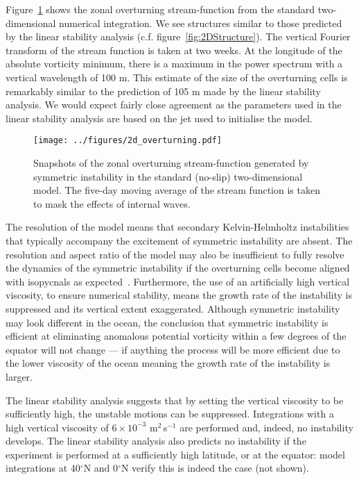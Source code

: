 Figure~\ref{fig:2DStandardOverturningStreamfunction} shows the zonal overturning stream-function from the standard two-dimensional numerical integration. We see structures similar to those predicted by the linear stability analysis (c.f. figure~\ref{fig:2DStructure}). The vertical Fourier transform of the stream function is taken at two weeks. At the longitude of the absolute vorticity minimum, there is a maximum in the power spectrum with a vertical wavelength of 100 m. This estimate of the size of the overturning cells is remarkably similar to the prediction of 105 m made by the linear stability analysis. We would expect fairly close agreement as the parameters used in the linear stability analysis are based on the jet used to initialise the model.

\begin{figure}
    \centering
    \texttt{[image: ../figures/2d\_overturning.pdf]}
    \caption{Snapshots of the zonal overturning stream-function generated by symmetric instability in the standard (no-slip) two-dimensional model. The five-day moving average of the stream function is taken to mask the effects of internal waves.}
    \label{fig:2DStandardOverturningStreamfunction}
\end{figure}

The resolution of the model means that secondary Kelvin-Helmholtz instabilities that typically accompany the excitement of symmetric instability are absent. The resolution and aspect ratio of the model may also be insufficient to fully resolve the dynamics of the symmetric instability if the overturning cells become aligned with isopycnals as expected~\citep{Bachman2014}. Furthermore, the use of an artificially high vertical viscosity, to ensure numerical stability,  means the growth rate of the instability is suppressed and its vertical extent exaggerated. Although symmetric instability may look different in the ocean, the conclusion that symmetric instability is efficient at eliminating anomalous potential vorticity within a few degrees of the equator will not change --- if anything the process will be more efficient due to the lower viscosity of the ocean meaning the growth rate of the instability is larger.

The linear stability analysis suggests that by setting the vertical viscosity to be sufficiently high, the unstable motions can be suppressed. Integrations with a high vertical viscosity of $6 \times 10^{-3}$ m$^2$\,s$^{-1}$ are performed and, indeed, no instability develops. The linear stability analysis also predicts no instability if the experiment is performed at a sufficiently high latitude, or at the equator: model integrations at 40$^{\circ}$N and 0$^{\circ}$N verify this is indeed the case (not shown).

